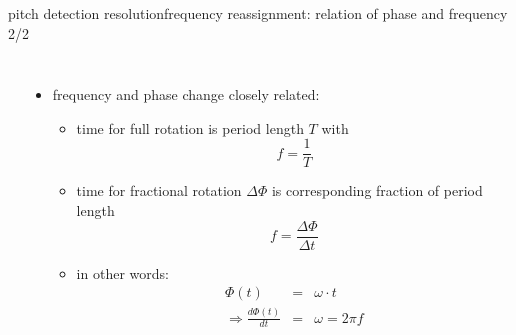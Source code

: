         \begin{frame}{pitch detection resolution}{frequency reassignment: relation of phase and frequency 2/2}

            \begin{columns}
                \begin{tiny}
                \end{tiny}
            \begin{itemize}
                \item   frequency and phase change closely related:
                    \begin{itemize}
                        \item<2-> time for full rotation is period length $T$ with \[f = \frac{1}{T}\]
                        \item<3-> time for fractional rotation $\Delta\Phi$ is corresponding fraction of period length \[f = \frac{\Delta\Phi}{\Delta t}\]
                        \item<4-> in other words: 
                        \begin{eqnarray*}
                            \Phi(t) &=& \omega\cdot t\\
                            \Rightarrow \frac{d\Phi(t)}{dt} &=& \omega = 2\pi f
                        \end{eqnarray*}
                    \end{itemize}
            \end{itemize}
            \end{columns}
        \end{frame}
